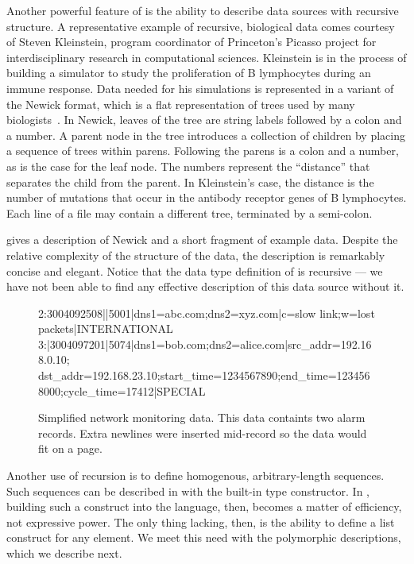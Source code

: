 Another powerful feature of \padsml{} is the ability to describe data
sources with recursive structure.  A representative example of
recursive, biological data comes courtesy of Steven Kleinstein,
program coordinator of Princeton's Picasso project for
interdisciplinary research in computational sciences.  Kleinstein is
in the process of building a simulator to study the proliferation of B
lymphocytes during an immune response.  Data needed for his
simulations is represented in a variant of the Newick format, which is
a flat representation of trees used by many biologists~\cite{newick}.
In Newick, leaves of the tree are string labels followed by a colon
and a number.  A parent node in the tree introduces a collection of
children by placing a sequence of trees within parens.  Following the
parens is a colon and a number, as is the case for the leaf node.  The
numbers represent the ``distance'' that separates the child from the
parent.  In Kleinstein's case, the distance is the number of mutations
that occur in the antibody receptor genes of B lymphocytes.  Each line
of a file may contain a different tree, terminated by a semi-colon.

 gives a description of Newick and a short fragment 
of example data.  Despite the relative complexity of the structure of the data,
the description is remarkably concise and elegant.  Notice that the data type
definition of  is recursive --- we have not been able to find any
effective description of this data source without it.

\begin{figure*}
  \centering
\begin{code}\scriptsize
 2:3004092508||5001|dns1=abc.com;dns2=xyz.com|c=slow link;w=lost packets|INTERNATIONAL
 3:|3004097201|5074|dns1=bob.com;dns2=alice.com|src_addr=192.168.0.10;
 dst_addr=192.168.23.10;start_time=1234567890;end_time=1234568000;cycle_time=17412|SPECIAL
\end{code}  
  \caption{Simplified network monitoring data.  This 
data containts two alarm records.  Extra newlines 
were inserted mid-record so the data would fit on a page.}
  \label{fig:darkstar-records}
\end{figure*}

Another use of recursion is to define homogenous, arbitrary-length
sequences. Such sequences can be described in \padsc{}with the
built-in type constructor. In \padsml{}, building such a
construct into the language, then, becomes a matter of efficiency, not
expressive power. The only thing lacking, then, is the ability to
define a list construct for any element. We meet this need with the
polymorphic descriptions, which we describe next.
  
